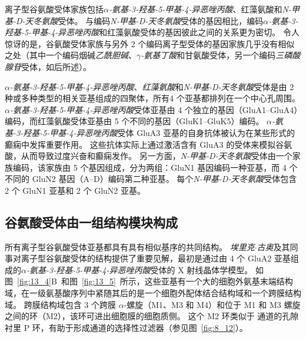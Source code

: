 离子型谷氨酸受体家族包括\textit{$\alpha$-氨基-3-羟基-5-甲基-4-异恶唑丙酸}、红藻氨酸和\textit{N-甲基-D-天冬氨酸}受体。
与编码\textit{N-甲基-D-天冬氨酸}受体的基因相比，编码\textit{$\alpha$-氨基-3-羟基-5-甲基-4-异恶唑丙酸}和红藻氨酸受体的基因彼此之间的关系更为密切。
令人惊讶的是，谷氨酸受体家族与另外 2 个编码离子型受体的基因家族几乎没有相似之处（其中一个编码烟碱\textit{乙酰胆碱}、\textit{$\gamma$-氨基丁酸}和甘氨酸受体，另一个编码\textit{三磷酸腺苷}受体，如后所述）。


\textit{$\alpha$-氨基-3-羟基-5-甲基-4-异恶唑丙酸}、\textit{红藻氨酸}和\textit{N-甲基-D-天冬氨酸}受体是由 2 种或多种类型的相关亚基组成的四聚体，所有4 个亚基都排列在一个中心孔周围。
\textit{$\alpha$-氨基-3-羟基-5-甲基-4-异恶唑丙酸}受体亚基由 4 个独立的基因（GluA1–GluA4）编码，而红藻氨酸受体亚基由 5 个不同的基因（GluK1–GluK5）编码。
\textit{$\alpha$-氨基-3-羟基-5-甲基-4-异恶唑丙酸}受体 GluA3 亚基的自身抗体被认为在某些形式的癫痫中发挥重要作用。
这些抗体实际上通过激活含有 GluA3 的受体来模拟谷氨酸，从而导致过度兴奋和癫痫发作。
另一方面，\textit{N-甲基-D-天冬氨酸}受体由一个家族编码，该家族由 5 个基因组成，分为两组：GluN1 基因编码一种亚基，而 4 个不同的 GluN2 基因（A–D）编码第二种亚基。
每个\textit{N-甲基-D-天冬氨酸}受体包含 2 个 GluN1 亚基和 2 个 GluN2 亚基。



\subsection{谷氨酸受体由一组结构模块构成}

所有离子型谷氨酸受体亚基都具有具有相似基序的共同结构。
\textit{埃里克$\cdot$古奥}及其同事对离子型谷氨酸受体的结构提供了重要见解，最初是通过由 4 个 GluA2 亚基组成的\textit{$\alpha$-氨基-3-羟基-5-甲基-4-异恶唑丙酸}受体的 X 射线晶体学模型。
如图~\ref{fig:13_4}B~和图~\ref{fig:13_5}~所示，这些亚基有一个大的细胞外氨基末端结构域，在一级氨基酸序列中紧随其后的是一个细胞外配体结合结构域和一个跨膜结构域。
跨膜结构域包含 3 个跨膜 $\alpha$-螺旋（M1、M3 和 M4）和位于 M1 和 M3 螺旋之间的环（M2），该环可进出细胞膜的细胞质侧。
这个 M2 环类似于  通道的孔隙衬里 P 环，有助于形成通道的选择性过滤器（参见图~\ref{fig:8_12}）。


